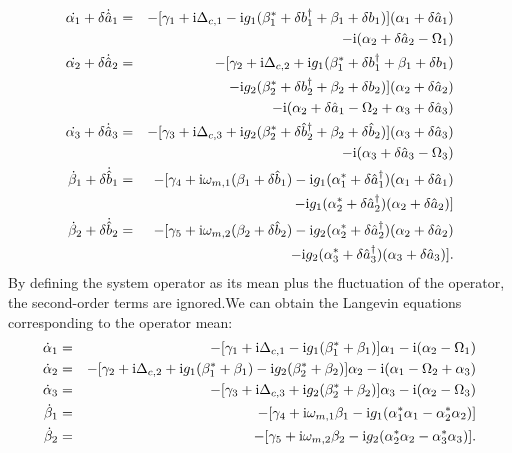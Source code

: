 \documentclass{article}
\begin{document}
\begin{eqnarray}\label{eq5}
\dot{\alpha_1}+\delta\dot{\hat a}_1 &=& -[\gamma_1+{\rm i}\Delta_{c,1}-{\rm i}g_1(\beta_1^\ast+\delta b_1^\dag +\beta_1+\delta b_1)](\alpha_1+\delta\hat a_1)\nonumber\\
&&-{\rm i}(\alpha_2+\delta\hat a_2-\Omega_1)\nonumber\\
\dot{\alpha_2}+\delta\dot{\hat a}_2 &=& -[\gamma_2+{\rm i}\Delta_{c,2}+{\rm i}g_1(\beta_1^\ast+\delta b_1^\dag +\beta_1+\delta b_1)\nonumber\\
&&-{\rm i}g_2(\beta_2^\ast+\delta b_2^\dag +\beta_2+\delta b_2)](\alpha_2+\delta\hat a_2)\nonumber\\
&& -{\rm i}(\alpha_2+\delta\hat a_1-\Omega_2+\alpha_3+\delta\hat a_3) \nonumber \\
\dot{\alpha_3}+\delta\dot{\hat a}_3 &=& -[\gamma_3+{\rm i}\Delta_{c,3}+{\rm i}g_2(\beta_2^\ast+\delta\hat b_2^\dag +\beta_2+\delta\hat b_2)](\alpha_3+\delta\hat a_3)\nonumber\\
&&-{\rm i}(\alpha_3+\delta\hat a_3-\Omega_3)\nonumber\\
\dot\beta_1+\delta\dot{\hat b}_1 &=& -[\gamma_4+{\rm i}\omega_{m,1}(\beta_1+\delta \hat b_1)-{\rm i}g_1(\alpha_1^\ast+\delta\hat a_1^\dag)(\alpha_1+\delta\hat a_1)\nonumber\\
&&-{\rm i}g_1(\alpha_2^\ast+\delta\hat a_2^\dag)(\alpha_2+\delta \hat a_2)]\nonumber\\
\dot\beta_2+\delta\dot{\hat b}_2 &=& -[\gamma_5+{\rm i}\omega_{m,2}(\beta_2+\delta \hat b_2)-{\rm i}g_2(\alpha_2^\ast+\delta\hat a_2^\dag)(\alpha_2+\delta\hat a_2)\nonumber\\
&&-{\rm i}g_2(\alpha_3^\ast+\delta\hat a_3^\dag)(\alpha_3+\delta\hat a_3)].
\end{eqnarray}
By defining the system operator as its mean plus the fluctuation of the operator, the second-order terms are ignored.We can obtain the Langevin equations corresponding to the operator mean:
\begin{eqnarray}\label{eq6}
\dot\alpha_1 &=& -[\gamma_1+{\rm i}\Delta_{c,1}-{\rm i}g_1(\beta_1^\ast+\beta_1)]\alpha_1-{\rm i}(\alpha_2-\Omega_1)\nonumber\\
\dot\alpha_2 &=& -[\gamma_2+{\rm i}\Delta_{c,2}+{\rm i}g_1(\beta_1^\ast+\beta_1)-{\rm i}g_2(\beta_2^\ast+\beta_2)]\alpha_2-{\rm i}(\alpha_1-\Omega_2+\alpha_3)\nonumber\\
\dot\alpha_3 &=& -[\gamma_3+{\rm i}\Delta_{c,3}+{\rm i}g_2(\beta_2^\ast+\beta_2)]\alpha_3-{\rm i}(\alpha_2-\Omega_3)\nonumber\\
\dot\beta_1 &=& -[\gamma_4+{\rm i}\omega_{m,1}\beta_1-{\rm i}g_1(\alpha_1^\ast\alpha_1-\alpha_2^\ast\alpha_2)]\nonumber\\
\dot\beta_2 &=& -[\gamma_5+{\rm i}\omega_{m,2}\beta_2-{\rm i}g_2(\alpha_2^\ast\alpha_2-\alpha_3^\ast\alpha_3)].
\end{eqnarray}
\end{document}
